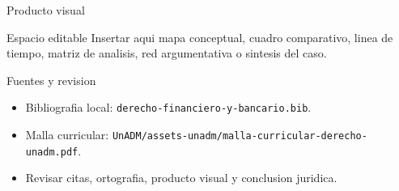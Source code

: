 \documentclass[
  spanish,
  aspectratio=169,
  xcolor={dvipsnames,table}
]{beamer}
\begin{document}
\begin{frame}{Producto visual}
  \begin{block}{Espacio editable}
    Insertar aqui mapa conceptual, cuadro comparativo, linea de tiempo,
    matriz de analisis, red argumentativa o sintesis del caso.
  \end{block}
  \centering
\end{frame}

\begin{frame}{Fuentes y revision}
  \begin{itemize}
    \item Bibliografia local: \texttt{derecho-financiero-y-bancario.bib}.
    \item Malla curricular: \texttt{UnADM/assets-unadm/malla-curricular-derecho-unadm.pdf}.
    \item Revisar citas, ortografia, producto visual y conclusion juridica.
  \end{itemize}
\end{frame}
\end{document}
